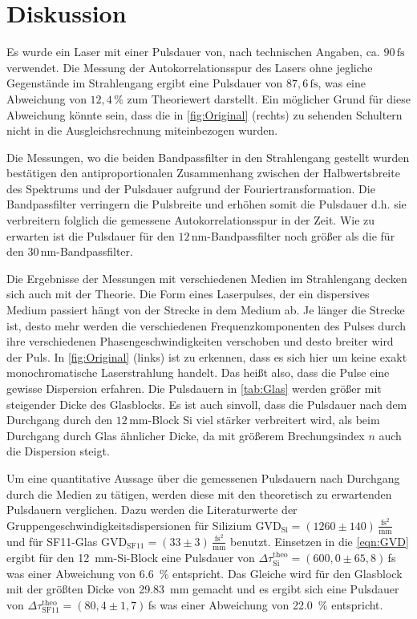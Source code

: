 \newpage
\section{Diskussion}
\label{sec:disskussion}

Es wurde ein Laser mit einer Pulsdauer von, nach technischen Angaben, ca. $90\,\si{\femto\second}$ verwendet.
Die Messung der Autokorrelationsspur des Lasers ohne jegliche Gegenstände im Strahlengang ergibt eine Pulsdauer von $87,6\,\si{\femto\second}$, was eine Abweichung von $12,4\,\%$ zum Theoriewert darstellt.
Ein möglicher Grund für diese Abweichung könnte sein, dass die in \autoref{fig:Original} (rechts) zu sehenden Schultern nicht in die Ausgleichsrechnung miteinbezogen wurden.

Die Messungen, wo die beiden Bandpassfilter in den Strahlengang gestellt wurden bestätigen den antiproportionalen Zusammenhang zwischen der Halbwertsbreite des Spektrums und der Pulsdauer aufgrund der Fouriertransformation.
Die Bandpassfilter verringern die Pulsbreite und erhöhen somit die Pulsdauer d.h. sie verbreitern folglich die gemessene Autokorrelationsspur in der Zeit.
Wie zu erwarten ist die Pulsdauer für den $12\,\si{\nano\meter}$-Bandpassfilter noch größer als die für den $30\,\si{\nano\meter}$-Bandpassfilter.

Die Ergebnisse der Messungen mit verschiedenen Medien im Strahlengang decken sich auch mit der Theorie.
Die Form eines Laserpulses, der ein dispersives Medium passiert hängt von der Strecke in dem Medium ab.
Je länger die Strecke ist, desto mehr werden die verschiedenen Frequenzkomponenten des Pulses durch ihre verschiedenen Phasengeschwindigkeiten verschoben und desto breiter wird der Puls.
In \autoref{fig:Original} (links) ist zu erkennen, dass es sich hier um keine exakt monochromatische Laserstrahlung handelt.
Das heißt also, dass die Pulse eine gewisse Dispersion erfahren.
Die Pulsdauern in \autoref{tab:Glas} werden größer mit steigender Dicke des Glasblocks.
Es ist auch sinvoll, dass die Pulsdauer nach dem Durchgang durch den $12\,\si{\milli\meter}$-Block Si viel stärker verbreitert wird, als beim Durchgang durch Glas ähnlicher Dicke, da mit größerem Brechungsindex $n$ auch die Dispersion steigt.

Um eine quantitative Aussage über die gemessenen Pulsdauern nach Durchgang durch die Medien zu tätigen, werden diese mit den theoretisch zu erwartenden Pulsdauern verglichen.
Dazu werden die Literaturwerte der Gruppengeschwindigkeitsdispersionen für Silizium $\mathrm{GVD}_{\mathrm{Si}} = (1260 \pm 140)\, \frac{\mathrm{fs}^2}{\mathrm{mm}}$ und für SF11-Glas $\mathrm{GVD}_{\mathrm{SF11}} = (33 \pm 3)\, \frac{\mathrm{fs}^2}{\mathrm{mm}}$ benutzt.
Einsetzen in die \autoref{eqn:GVD} ergibt für den \qty{12}{mm}-Si-Block eine Pulsdauer von $\Delta\tau_{\mathrm{Si}}^{\mathrm{theo}} = (600,0 \pm 65,8)\,$fs was einer Abweichung von \qty{6,6}{\%} entspricht.
Das Gleiche wird für den Glasblock mit der größten Dicke von \qty{29,83}{mm} gemacht und es ergibt sich eine Pulsdauer von $\Delta\tau_{\mathrm{SF11}}^{\mathrm{theo}} = (80,4 \pm 1,7)\,$fs was einer Abweichung von \qty{22,0}{\%} entspricht.

